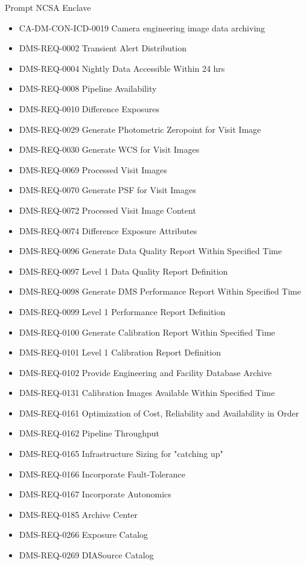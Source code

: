 Prompt NCSA Enclave \begin{itemize}
\item CA-DM-CON-ICD-0019 Camera engineering image data archiving
\item DMS-REQ-0002 Transient Alert Distribution
\item DMS-REQ-0004 Nightly Data Accessible Within 24 hrs
\item DMS-REQ-0008 Pipeline Availability
\item DMS-REQ-0010 Difference Exposures
\item DMS-REQ-0029 Generate Photometric Zeropoint for Visit Image
\item DMS-REQ-0030 Generate WCS for Visit Images
\item DMS-REQ-0069 Processed Visit Images
\item DMS-REQ-0070 Generate PSF for Visit Images
\item DMS-REQ-0072 Processed Visit Image Content
\item DMS-REQ-0074 Difference Exposure Attributes
\item DMS-REQ-0096 Generate Data Quality Report Within Specified Time
\item DMS-REQ-0097 Level 1 Data Quality Report Definition
\item DMS-REQ-0098 Generate DMS Performance Report Within Specified Time
\item DMS-REQ-0099 Level 1 Performance Report Definition
\item DMS-REQ-0100 Generate Calibration Report Within Specified Time
\item DMS-REQ-0101 Level 1 Calibration Report Definition
\item DMS-REQ-0102 Provide Engineering and Facility Database Archive
\item DMS-REQ-0131 Calibration Images Available Within Specified Time
\item DMS-REQ-0161 Optimization of Cost, Reliability and Availability in Order
\item DMS-REQ-0162 Pipeline Throughput
\item DMS-REQ-0165 Infrastructure Sizing for "catching up"
\item DMS-REQ-0166 Incorporate Fault-Tolerance
\item DMS-REQ-0167 Incorporate Autonomics
\item DMS-REQ-0185 Archive Center
\item DMS-REQ-0266 Exposure Catalog
\item DMS-REQ-0269 DIASource Catalog

\end{itemize}

